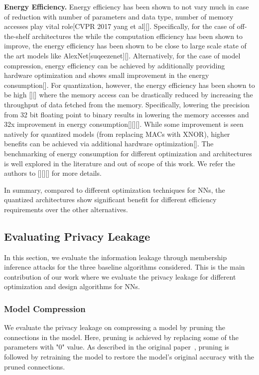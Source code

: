 \noindent\textbf{Energy Efficiency.} Energy efficiency has been shown to not vary much in case of reduction with number of parameters and data type, number of memory accesses play vital role[CVPR 2017 yang et al][].
Specifically, for the case of off-the-shelf architectures the while the computation efficiency has been shown to improve, the energy efficiency has been shown to be close to large scale state of the art models like AlexNet[suqeezenet][].
Alternatively, for the case of model compression, energy efficiency can be achieved by additionally providing hardware optimization and shows small improvement in the energy consumption[].
For quantization, however, the energy efficiency has been shown to be high [][] where the memory access can be drastically reduced by increasing the throughput of data fetched from the memory.
Specifically, lowering the precision from 32 bit floating point to binary results in lowering the memory accesses and 32x improvement in energy consumption[][][].
While some improvement is seen natively for quantized models (from replacing MACs with XNOR), higher benefits can be achieved via additional hardware optimization[].
The benchmarking of energy consumption for different optimization and architectures is well explored in the literature and out of scope of this work. We refer the authors to [][][] for more details.

In summary, compared to different optimization techniques for NNs, the quantized architectures show significant benefit for different efficiency requirements over the other alternatives.


\subsection{Evaluating Privacy Leakage}

In this section, we evaluate the information leakage through membership inference attacks for the three baseline algorithms considered.
This is the main contribution of our work where we evaluate the privacy leakage for different optimization and design algorithms for NNs.

\subsubsection{Model Compression}

We evaluate the privacy leakage on compressing a model by pruning the connections in the model.
Here, pruning is achieved by replacing some of the parameters with "0" value.
As described in the original paper~\cite{}, pruning is followed by retraining the model to restore the model's original accuracy with the pruned connections.

